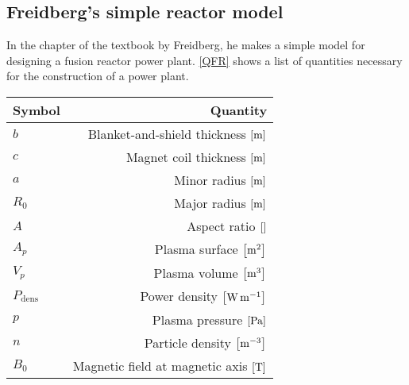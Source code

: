\subsection{Freidberg's simple reactor model}
In the  chapter of the textbook by Freidberg\cite{freidberg_plasma_2007}, he makes a simple model for designing a fusion reactor power plant. \cref{QFR} shows a list of quantities necessary for the construction of a power plant.
\begin{table}
	\begin{tabular}{lr}
		\toprule
		Symbol                    & Quantity                                                                                               \\
		\midrule
		\(b\)                     & Blanket-and-shield thickness \(\bqty{\si{\meter}}\)                                                    \\
		\(c\)                     & Magnet coil thickness \(\bqty{\si{\meter}}\)                                                           \\
		\(a\)                     & Minor radius \(\bqty{\si{\meter}}\)                                                                    \\
		\(R_0\)                   & Major radius \(\bqty{\si{\meter}}\)                                                                    \\
		\(A\)                     & Aspect ratio \(\bqty{}\)                                                                               \\
		\(A_p\)                   & Plasma surface \(\bqty{\si{\meter\squared}}\)                                                          \\
		\(V_p\)                   & Plasma volume \(\bqty{\si{\meter\cubed}}\)                                                             \\
		\(P_\mathrm{dens}\)       & Power density \(\bqty{\si{\watt\per\meter}}\)                                                          \\
		\(p\)                     & Plasma pressure \(\bqty{\si{\pascal}}\)                                                                \\
		\(n\)                     & Particle density \(\bqty{\si{\per\meter\cubed}}\)                                                      \\
		\(B_0\)                   & Magnetic field at magnetic axis \(\bqty{\si{\tesla}}\)                                                 \\

\end{tabular}
\end{table}
